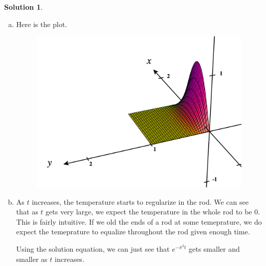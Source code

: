 \documentclass[12pt]{report} %
\theoremstyle{definition}
\newtheorem{solution}{Solution}
\begin{document}
\begin{solution}
\begin{enumerate}[(a)]
    \item Here is the plot.
    \begin{figure}[H]
        \centering
        \includegraphics[width=.7\textwidth]{Images/heat_equation_solution.png}
    \end{figure}
    \item As $t$ increases, the temperature starts to regularize in the rod.  We can see that as $t$ gets very large, we expect the temperature in the whole rod to be $0$.  This is fairly intuitive.  If we old the ends of a rod at some temeprature, we do expect the temeprature to equalize throughout the rod given enough time.
    
    Using the solution equation, we can just see that $e^{-\pi^2 t}$ gets smaller and smaller as $t$ increases.
\end{enumerate}

\end{solution}
\end{document}
